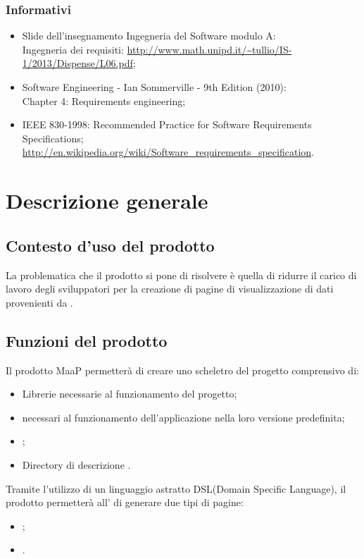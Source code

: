 \subsubsection{Informativi} %
\begin{itemize}
\item Slide dell'insegnamento Ingegneria del Software modulo A:\\
Ingegneria dei requisiti: \url{http://www.math.unipd.it/~tullio/IS-1/2013/Dispense/L06.pdf};
\item Software Engineering - Ian Sommerville - 9th Edition (2010):\\
Chapter 4: Requirements engineering;
\item IEEE 830-1998: Recommended Practice for Software Requirements Specifications;\\
\url{http://en.wikipedia.org/wiki/Software_requirements_specification}.

\end{itemize}

\newpage
\section{Descrizione generale}%
\subsection{Contesto d'uso del prodotto} %
La problematica che il prodotto si pone di risolvere è quella di ridurre il carico di lavoro degli sviluppatori per la creazione di pagine  di visualizzazione di dati provenienti da .

\subsection{Funzioni del prodotto} %
Il prodotto MaaP permetterà di creare uno scheletro del progetto comprensivo di:
\begin{itemize}
\item Librerie necessarie al funzionamento del progetto;
\item {} necessari al funzionamento dell'applicazione nella loro versione predefinita;
\item {};
\item Directory di descrizione .
\end{itemize}
Tramite l'utilizzo di un linguaggio astratto DSL(Domain Specific Language), il prodotto permetterà all' di generare due tipi di pagine:
\begin{itemize}
\item {};
\item {}.
\end{itemize}

